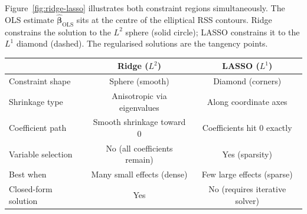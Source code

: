 \documentclass[11pt,a4paper]{article}
\theoremstyle{plain}
\theoremstyle{definition}
\newcommand{\bhat}{\hat{\bm{\beta}}}
\begin{document}
Figure~\ref{fig:ridge-lasso} illustrates both constraint regions
simultaneously.
The OLS estimate $\bhat_{\text{OLS}}$ sits at the centre of the
elliptical RSS contours.
Ridge constrains the solution to the $L^2$ sphere (solid circle);
LASSO constrains it to the $L^1$ diamond (dashed).
The regularised solutions are the tangency points.

\begin{center}
\begin{tabular}{lcc}
\toprule
& \textbf{Ridge ($L^2$)} & \textbf{LASSO ($L^1$)} \\
\midrule
Constraint shape & Sphere (smooth) & Diamond (corners) \\
Shrinkage type & Anisotropic via eigenvalues & Along coordinate axes \\
Coefficient path & Smooth shrinkage toward 0 & Coefficients hit 0 exactly \\
Variable selection & No (all coefficients remain) & Yes (sparsity) \\
Best when & Many small effects (dense) & Few large effects (sparse) \\
Closed-form solution & Yes & No (requires iterative solver) \\
\bottomrule
\end{tabular}
\end{center}

\end{document}
